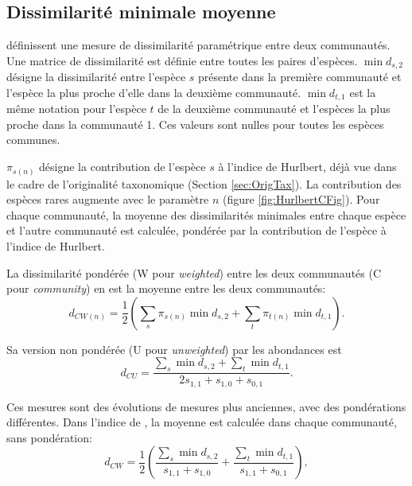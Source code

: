 \documentclass[
  11pt,
  french,
  a4paper,
  extrafontsizes,onecolumn,openright
  ]{memoir}
\begin{document}
\hypertarget{dissimilarituxe9-minimale-moyenne}{%
\subsection{Dissimilarité minimale moyenne}\label{dissimilarituxe9-minimale-moyenne}}

\textcite{Ricotta2010} définissent une mesure de dissimilarité paramétrique entre deux communautés.
Une matrice de dissimilarité est définie entre toutes les paires d'espèces.
\(\min{d_{s,2}}\) désigne la dissimilarité entre l'espèce \(s\) présente dans la première communauté et l'espèce la plus proche d'elle dans la deuxième communauté.
\(\min{d_{t,1}}\) est la même notation pour l'espèce \(t\) de la deuxième communauté et l'espèces la plus proche dans la communauté 1.
Ces valeurs sont nulles pour toutes les espèces communes.

\(\pi_{s(n)}\) désigne la contribution de l'espèce \(s\) à l'indice de Hurlbert, déjà vue dans le cadre de l'originalité taxonomique (Section \ref{sec:OrigTax}).
La contribution des espèces rares augmente avec le paramètre \(n\) (figure \ref{fig:HurlbertCFig}).
Pour chaque communauté, la moyenne des dissimilarités minimales entre chaque espèce et l'autre communauté est calculée, pondérée par la contribution de l'espèce à l'indice de Hurlbert.

La dissimilarité pondérée (W pour \emph{weighted}) entre les deux communautés (C pour \emph{community}) en est la moyenne entre les deux communautés:
\begin{equation}
  \label{eq:CWn}
  d_{\mathit{CW}(n)} = \frac{1}{2}\left(\sum_s{\pi_{s(n)} \min{d_{s,2}}} + \sum_t{\pi_{t(n)} \min{d_{t,1}}} \right).
\end{equation}

Sa version non pondérée (U pour \emph{unweighted}) par les abondances est \autocite{Ricotta2008}
\begin{equation}
  \label{eq:CU}
  d_{\mathit{CU}} = \frac{\sum_s{\min{d_{s,2}}} + \sum_t{\min{d_{t,1}}}}{2s_{1,1}+s_{1,0}+s_{0,1}}.
\end{equation}

Ces mesures sont des évolutions de mesures plus anciennes, avec des pondérations différentes.
Dans l'indice de \textcite{Clarke1998}, la moyenne est calculée dans chaque communauté, sans pondération:
\begin{equation}
  \label{eq:CW}
  d_{\mathit{CW}} = \frac{1}{2}\left( \frac{\sum_s{\min{d_{s,2}}}}{s_{1,1}+s_{1,0}} + \frac{\sum_t{\min{d_{t,1}}}}{s_{1,1}+s_{0,1}} \right),
\end{equation}
\end{document}
